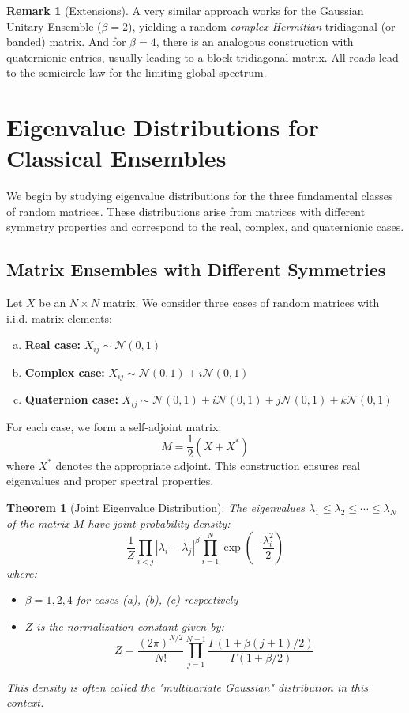 \documentclass[letterpaper,11pt,oneside,reqno]{article}
\numberwithin{equation}{section}
\newtheorem{theorem}[proposition]{Theorem}
\theoremstyle{definition}
\newtheorem{remark}[proposition]{Remark}
\begin{document}
\begin{remark}[Extensions]
A very similar approach works for the Gaussian Unitary Ensemble (\(\beta=2\)), yielding a random \emph{complex Hermitian} tridiagonal (or banded) matrix.  And for \(\beta=4\), there is an analogous construction with quaternionic entries, usually leading to a block-tridiagonal matrix.  All roads lead to the semicircle law for the limiting global spectrum.
\end{remark}




\newpage
\section{Eigenvalue Distributions for Classical Ensembles}

We begin by studying eigenvalue distributions for the three fundamental classes of random matrices. These distributions arise from matrices with different symmetry properties and correspond to the real, complex, and quaternionic cases.

\subsection{Matrix Ensembles with Different Symmetries}

Let $X$ be an $N\times N$ matrix. We consider three cases of random matrices with i.i.d. matrix elements:

\begin{enumerate}[a)]
\item \textbf{Real case:} $X_{ij} \sim \mathcal{N}(0,1)$
\item \textbf{Complex case:} $X_{ij} \sim \mathcal{N}(0,1) + i\mathcal{N}(0,1)$
\item \textbf{Quaternion case:} $X_{ij} \sim \mathcal{N}(0,1) + i\mathcal{N}(0,1) + j\mathcal{N}(0,1) + k\mathcal{N}(0,1)$
\end{enumerate}

For each case, we form a self-adjoint matrix:
\[ M = \frac{1}{2}(X + X^*) \]
where $X^*$ denotes the appropriate adjoint. This construction ensures real eigenvalues and proper spectral properties.

\begin{theorem}[Joint Eigenvalue Distribution]
\label{thm:joint_density}
The eigenvalues $\lambda_1 \leq \lambda_2 \leq \cdots \leq \lambda_N$ of the matrix $M$ have joint probability density:
\[ \frac{1}{Z} \prod_{i<j} |\lambda_i-\lambda_j|^\beta \prod_{i=1}^N \exp\left(-\frac{\lambda_i^2}{2}\right) \]
where:
\begin{itemize}
\item $\beta = 1,2,4$ for cases (a), (b), (c) respectively
\item $Z$ is the normalization constant given by:
\[ Z = \frac{(2\pi)^{N/2}}{N!} \prod_{j=1}^{N-1} \frac{\Gamma(1+\beta(j+1)/2)}{\Gamma(1+\beta/2)} \]
\end{itemize}
This density is often called the "multivariate Gaussian" distribution in this context.
\end{theorem}
\end{document}
